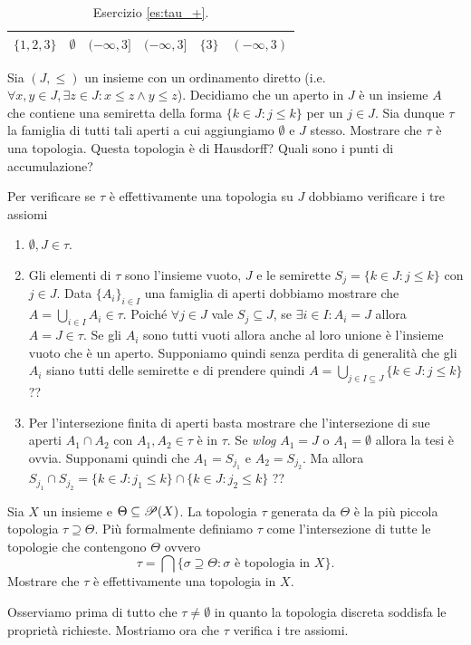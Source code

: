 \documentclass[a4paper]{article}\par \usepackage{style}\par
\begin{document}
\begin{table}[h]
\begin{tabular}{c|ccccc}
    $ \{1, 2, 3\} $  &  $ \emptyset $   & $ (-\infty, 3] $ & $ (-\infty, 3] $ &   $ \{3\} $   & $ (-\infty, 3) $ \\ \hline
  \end{tabular}
  \caption{Esercizio \ref{es:tau_+}.}
\end{table}\par \begin{es}
  Sia $ (J, \leq) $ un insieme con un ordinamento diretto (i.e. $ \forall x, y \in J, \exists z \in J : x \leq z \wedge y \leq z $). Decidiamo che un aperto in $ J $ è un insieme $ A $ che contiene una semiretta della forma $ \{k \in J : j \leq k\} $ per un $ j \in J $. Sia dunque $ \tau $ la famiglia di tutti tali aperti a cui aggiungiamo $ \emptyset $ e $ J $ stesso. Mostrare che $ \tau $ è una topologia. Questa topologia è di Hausdorff? Quali sono i punti di accumulazione?
\end{es}\par Per verificare se $ \tau $ è effettivamente una topologia su $ J $ dobbiamo verificare i tre assiomi
\begin{enumerate}[label = (\roman*)]
\item $ \emptyset, J \in \tau $.
\item Gli elementi di $ \tau $ sono l'insieme vuoto, $ J $ e le semirette $ S_j = \{k \in J : j \leq k\} $ con $ j \in J $. Data $ \{A_i\}_{i \in I} $ una famiglia di aperti dobbiamo mostrare che $ A = \bigcup_{i \in I} A_i \in \tau $. Poiché $ \forall j \in J $ vale $ S_j \subseteq J $, se $ \exists i \in I : A_i = J $ allora $ A = J \in \tau $. Se gli $ A_i $ sono tutti vuoti allora anche al loro unione è l'insieme vuoto che è un aperto. Supponiamo quindi senza perdita di generalità che gli $ A_i $ siano tutti delle semirette e di prendere quindi $ A = \bigcup_{j \in I \subseteq J} \{k \in J : j \leq k\} $ ??
\item Per l'intersezione finita di aperti basta mostrare che l'intersezione di sue aperti $ A_1 \cap A_2 $ con $ A_1, A_2 \in \tau $ è in $ \tau $. Se \emph{wlog} $ A_1 = J $ o $ A_1 = \emptyset $ allora la tesi è ovvia. Supponami quindi che $ A_1 = S_{j_1} $ e $ A_2 = S_{j_2} $. Ma allora $ S_{j_1} \cap S_{j_2} = \{k \in J : j_1 \leq k\} \cap \{k \in J : j_2 \leq k\} $ ??
\end{enumerate}\par \begin{es}
  Sia $ X $ un insieme e $ \Theta \subseteq \P(X) $. La topologia $ \tau $ generata da $ \Theta $ è la più piccola topologia $ \tau \supseteq \Theta $. Più formalmente definiamo $ \tau $ come l'intersezione di tutte le topologie che contengono $ \Theta $ ovvero \[\tau = \bigcap \{\sigma \supseteq \Theta : \sigma \text{ è topologia in } X\}.\] Mostrare che $ \tau $ è effettivamente una topologia in $ X $.
\end{es}\par Osserviamo prima di tutto che $ \tau \neq \emptyset $ in quanto la topologia discreta soddisfa le proprietà richieste. Mostriamo ora che $ \tau $ verifica i tre assiomi.
\end{document}
